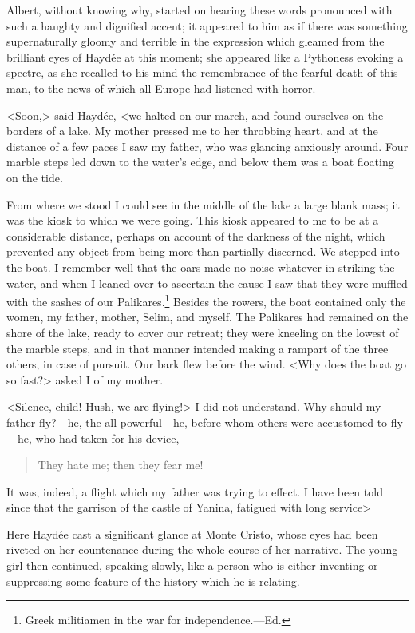  Albert, without knowing why, started on hearing these words pronounced with such a haughty and dignified accent; it appeared to him as if there was something supernaturally gloomy and terrible in the expression which gleamed from the brilliant eyes of Haydée at this moment; she appeared like a Pythoness evoking a spectre, as she recalled to his mind the remembrance of the fearful death of this man, to the news of which all Europe had listened with horror. 

 <Soon,> said Haydée, <we halted on our march, and found ourselves on the borders of a lake. My mother pressed me to her throbbing heart, and at the distance of a few paces I saw my father, who was glancing anxiously around. Four marble steps led down to the water's edge, and below them was a boat floating on the tide.  
 
 From where we stood I could see in the middle of the lake a large blank mass; it was the kiosk to which we were going. This kiosk appeared to me to be at a considerable distance, perhaps on account of the darkness of the night, which prevented any object from being more than partially discerned. We stepped into the boat. I remember well that the oars made no noise whatever in striking the water, and when I leaned over to ascertain the cause I saw that they were muffled with the sashes of our Palikares.\footnote{Greek militiamen in the war for independence.—Ed. } Besides the rowers, the boat contained only the women, my father, mother, Selim, and myself. The Palikares had remained on the shore of the lake, ready to cover our retreat; they were kneeling on the lowest of the marble steps, and in that manner intended making a rampart of the three others, in case of pursuit. Our bark flew before the wind. <Why does the boat go so fast?> asked I of my mother. 

 <Silence, child! Hush, we are flying!> I did not understand. Why should my father fly?—he, the all-powerful—he, before whom others were accustomed to fly—he, who had taken for his device,  
 \begin{quote}They hate me; then they fear me!\end{quote}

It was, indeed, a flight which my father was trying to effect. I have been told since that the garrison of the castle of Yanina, fatigued with long service\longdash> 

 Here Haydée cast a significant glance at Monte Cristo, whose eyes had been riveted on her countenance during the whole course of her narrative. The young girl then continued, speaking slowly, like a person who is either inventing or suppressing some feature of the history which he is relating. 

